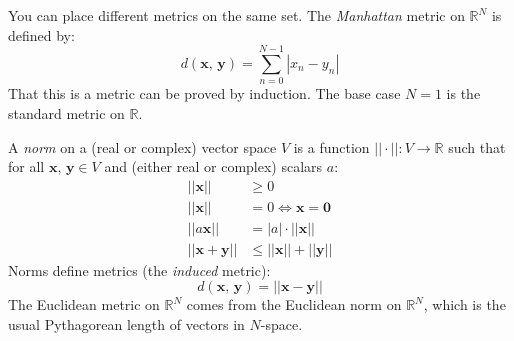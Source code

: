 \documentclass{article}
\theoremstyle{plain}
\theoremstyle{normal}
\newenvironment{example}{%
    \pushQED{\qed}\renewcommand{\qedsymbol}{$\blacksquare$}\examplex%
}{%
    \popQED\endexamplex%
}
\begin{document}
        \begin{example}
            You can place different metrics on the same set. The
            \textit{Manhattan} metric on $\mathbb{R}^{N}$ is defined by:
            \begin{equation}
                d(\mathbf{x},\,\mathbf{y})
                =\sum_{n=0}^{N-1}|x_{n}-y_{n}|
            \end{equation}
            That this is a metric can be proved by induction. The base case
            $N=1$ is the standard metric on $\mathbb{R}$.
        \end{example}
        \begin{example}
            A \textit{norm} on a (real or complex) vector space $V$ is a
            function $||\cdot||:V\rightarrow\mathbb{R}$ such that for all
            $\mathbf{x},\,\mathbf{y}\in{V}$ and (either real or complex)
            scalars $a$:
            \begin{align}
                ||\mathbf{x}||&\geq{0}
                    \tag{Positivity}\\
                ||\mathbf{x}||&=0\Leftrightarrow\mathbf{x}=\mathbf{0}
                    \tag{Definiteness}\\
                ||a\mathbf{x}||&=|a|\cdot||\mathbf{x}||
                    \tag{Factoring Scalars}\\
                ||\mathbf{x}+\mathbf{y}||&\leq||\mathbf{x}||+||\mathbf{y}||
                    \tag{Triangle Inequality}
            \end{align}
            Norms define metrics (the \textit{induced} metric):
            \begin{equation}
                d(\mathbf{x},\,\mathbf{y})=||\mathbf{x}-\mathbf{y}||
            \end{equation}
            The Euclidean metric on $\mathbb{R}^{N}$ comes from the Euclidean
            norm on $\mathbb{R}^{N}$, which is the usual Pythagorean length
            of vectors in $N$-space.%
        \end{example}
\end{document}
